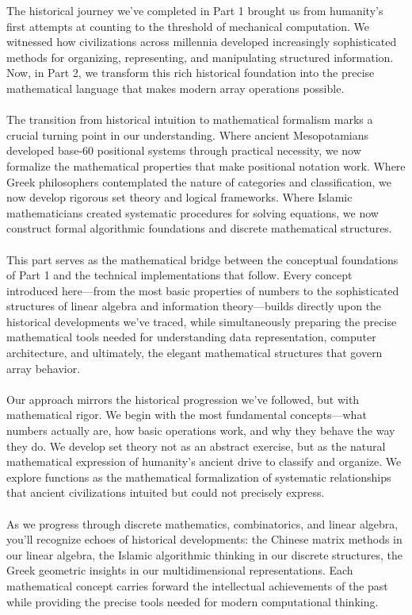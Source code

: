\documentclass[12pt, oneside, openany]{book}
\begin{document}
The historical journey we've completed in Part 1 brought us from humanity's first attempts at counting to the threshold of mechanical computation. We witnessed how civilizations across millennia developed increasingly sophisticated methods for organizing, representing, and manipulating structured information. Now, in Part 2, we transform this rich historical foundation into the precise mathematical language that makes modern array operations possible.\\
\\
The transition from historical intuition to mathematical formalism marks a crucial turning point in our understanding. Where ancient Mesopotamians developed base-60 positional systems through practical necessity, we now formalize the mathematical properties that make positional notation work. Where Greek philosophers contemplated the nature of categories and classification, we now develop rigorous set theory and logical frameworks. Where Islamic mathematicians created systematic procedures for solving equations, we now construct formal algorithmic foundations and discrete mathematical structures.\\
\\
This part serves as the mathematical bridge between the conceptual foundations of Part 1 and the technical implementations that follow. Every concept introduced here—from the most basic properties of numbers to the sophisticated structures of linear algebra and information theory—builds directly upon the historical developments we've traced, while simultaneously preparing the precise mathematical tools needed for understanding data representation, computer architecture, and ultimately, the elegant mathematical structures that govern array behavior.\\
\\
Our approach mirrors the historical progression we've followed, but with mathematical rigor. We begin with the most fundamental concepts—what numbers actually are, how basic operations work, and why they behave the way they do. We develop set theory not as an abstract exercise, but as the natural mathematical expression of humanity's ancient drive to classify and organize. We explore functions as the mathematical formalization of systematic relationships that ancient civilizations intuited but could not precisely express.\\
\\
As we progress through discrete mathematics, combinatorics, and linear algebra, you'll recognize echoes of historical developments: the Chinese matrix methods in our linear algebra, the Islamic algorithmic thinking in our discrete structures, the Greek geometric insights in our multidimensional representations. Each mathematical concept carries forward the intellectual achievements of the past while providing the precise tools needed for modern computational thinking.\\
\end{document}
